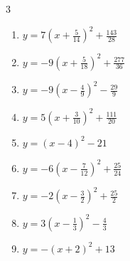 \begin{multicols}{3}
\begin{enumerate}

  \item $\displaystyle y=7\left( x+\frac{5}{14}\right)^{2}+\frac{143}{28}$


  \item $\displaystyle y=-9\left( x+\frac{5}{18}\right)^{2}+\frac{277}{36}$


  \item $\displaystyle y=-9\left( x-\frac{4}{9}\right)^{2}-\frac{29}{9}$


  \item $\displaystyle y=5\left( x+\frac{3}{10}\right)^{2}+\frac{111}{20}$


  \item $\displaystyle y=\left( x-4\right)^{2}-21$

        \phantom{$\displaystyle 頂点\left( 4 , -21 \right)$}

\columnbreak %

  \item $\displaystyle y=-6\left( x-\frac{7}{12}\right)^{2}+\frac{25}{24}$


  \item $\displaystyle y=-2\left( x-\frac{3}{2}\right)^{2}+\frac{25}{2}$


  \item $\displaystyle y=3\left( x-\frac{1}{3}\right)^{2}-\frac{4}{3}$


  \item $\displaystyle y=-\left( x+2\right)^{2}+13$

        \phantom{$\displaystyle 頂点\left( -2 , 13 \right)$}


\end{enumerate}
\end{multicols}
